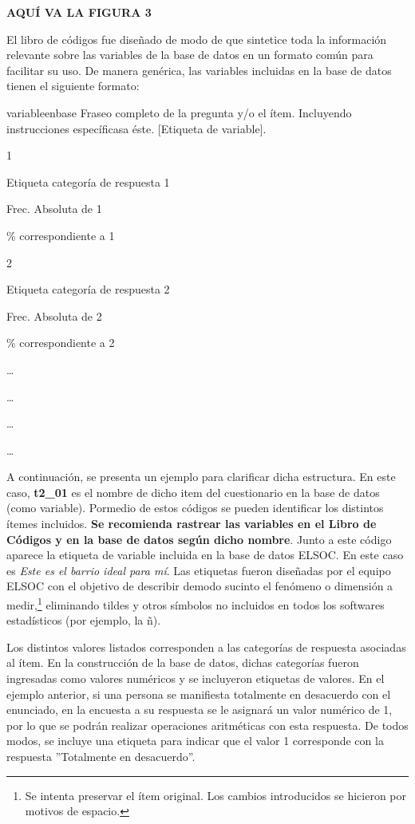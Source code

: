 \documentclass[
]{book}
\begin{document}
\textbf{AQUÍ VA LA FIGURA 3}

El libro de códigos fue diseñado de modo de que sintetice toda la
información relevante sobre las variables de la base de datos en un
formato común para facilitar su uso. De manera genérica, las variables
incluidas en la base de datos tienen el siguiente formato:

{variableenbase} Fraseo completo de la pregunta y/o el ítem. Incluyendo
instrucciones específicasa éste. {[}Etiqueta de variable{]}.

1

Etiqueta categoría de respuesta 1

Frec. Absoluta de 1

\% correspondiente a 1

2

Etiqueta categoría de respuesta 2

Frec. Absoluta de 2

\% correspondiente a 2

\ldots{}

\ldots{}

\ldots{}

\ldots{}

A continuación, se presenta un ejemplo para clarificar dicha estructura.
En este caso, \textbf{t2\_01} es el nombre de dicho item del
cuestionario en la base de datos (como variable). Pormedio de estos
códigos se pueden identificar los distintos ítemes incluidos. \textbf{Se
recomienda rastrear las variables en el Libro de Códigos y en la base de
datos según dicho nombre}. Junto a este código aparece la etiqueta de
variable incluida en la base de datos ELSOC. En este caso es \emph{Este
es el barrio ideal para mí}. Las etiquetas fueron diseñadas por el
equipo ELSOC con el objetivo de describir demodo sucinto el fenómeno o
dimensión a medir,\footnote{Se intenta preservar el ítem original. Los
  cambios introducidos se hicieron por motivos de espacio.} eliminando
tildes y otros símbolos no incluidos en todos los softwares estadísticos
(por ejemplo, la ñ).

Los distintos valores listados corresponden a las categorías de
respuesta asociadas al ítem. En la construcción de la base de datos,
dichas categorías fueron ingresadas como valores numéricos y se
incluyeron etiquetas de valores. En el ejemplo anterior, si una persona
se manifiesta totalmente en desacuerdo con el enunciado, en la encuesta
a su respuesta se le asignará un valor numérico de 1, por lo que se
podrán realizar operaciones aritméticas con esta respuesta. De todos
modos, se incluye una etiqueta para indicar que el valor 1 corresponde
con la respuesta ''Totalmente en desacuerdo''.
\end{document}
